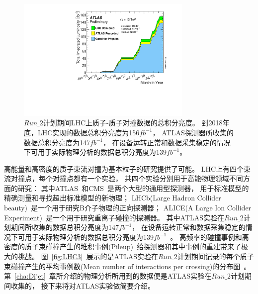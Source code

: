 \begin{figure}
  \begin{center}
    \includegraphics[width=0.75\textwidth]{figuresEXP/LHC2.pdf}
  \end{center}
  \caption{
  $Run\_2$计划期间LHC上质子-质子对撞数据的总积分亮度。
  到2018年底，LHC实现的数据总积分亮度为156$fb^{-1}$，
  ATLAS探测器所收集的数据总积分亮度为147$fb^{-1}$，
  在设备运转正常和数据采集稳定的情况下可用于实际物理分析的数据总积分亮度为139$fb^{-1}$。
  }
    \label{fig:LHC2}
\end{figure}

高能量和高密度的质子束流对撞为基本粒子的研究提供了可能。
LHC上有四个束流对撞点，每个对撞点都有一个实验，
共四个实验分别用于高能物理领域不同方面的研究：
其中ATLAS~\cite{PERF-2007-01}和CMS~\cite{CMS}是两个大型的通用型探测器，
用于标准模型的精确测量和寻找超出标准模型的新物理；
LHCb(Large Hadron Collider beauty)~\cite{LHCb}是一个用于研究B介子物理的正向探测器；
ALICE(A Large Ion Collider Experiment)~\cite{ALICE}是一个用于研究重离子碰撞的探测器。
其中ATLAS实验在$Run\_2$计划期间所收集的数据总积分亮度为147$fb^{-1}$，
在设备运转正常和数据采集稳定的情况下可用于实际物理分析的数据总积分亮度为139$fb^{-1}$~\cite{ATLASWEB1}。
高频率的碰撞事例和高密度的质子束碰撞产生的堆积事例(Pileup)~\cite{PileUp}给探测器和其中事例的重建带来了极大的挑战。
图~\ref{fig:LHC3}~展示的是ATLAS实验在$Run\_2$计划期间记录的每个质子束碰撞产生的平均事例数(Mean number of interactions per crossing)的分布图~\cite{ATLASWEB1}。
第~\ref{cha:Dijet}~章所介绍的物理分析所用到的数据便是ATLAS实验在$Run\_2$计划期间收集的，
接下来将对ATLAS实验做简要介绍。

